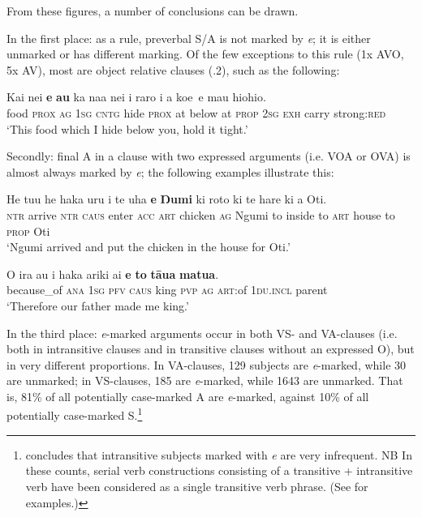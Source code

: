 From these figures, a number of conclusions can be drawn. 

In the first place: as a rule, preverbal S/A is not marked by \textit{e}; it is either unmarked or has different marking. Of the few exceptions to this rule (1x AVO, 5x AV), most are object relative clauses (.2), such as the following:

\ea\label{ex:8.8}
\gll Kai nei {\ob}\textbf{e} \textbf{au} ka na{\ꞌ}a nei {\ꞌ}i raro i a koe\,{\cb} e ma{\ꞌ}u hiohio.\\
food \textsc{prox} {\db}\textsc{ag} \textsc{1sg} \textsc{cntg} hide \textsc{prox} at below at \textsc{prop} \textsc{2sg} \textsc{exh} carry strong:\textsc{red}\\

\glt 
‘This food which I hide below you, hold it tight.’ \textstyleExampleref{[R310.074]} 
\z

Secondly: final A in a clause with two expressed arguments (i.e. VOA or OVA) is almost always marked by \textit{e}; the following examples illustrate this:

\ea\label{ex:8.9}
\gll He tu{\ꞌ}u he haka uru i te {\ꞌ}uha \textbf{e} \textbf{Ŋumi} ki roto ki te hare  ki a Oti.\\
\textsc{ntr} arrive \textsc{ntr} \textsc{caus} enter \textsc{acc} \textsc{art} chicken \textsc{ag} Ngumi to inside to \textsc{art} house  to \textsc{prop} Oti\\

\glt 
‘Ngumi arrived and put the chicken in the house for Oti.’ \textstyleExampleref{[MsE-105b.004]}
\z

\ea\label{ex:8.10}
\gll {\ꞌ}O ira au i haka {\ꞌ}ariki ai \textbf{e} \textbf{to} \textbf{tāua} \textbf{matu{\ꞌ}a}.\\
because\_of \textsc{ana} \textsc{1sg} \textsc{pfv} \textsc{caus} king \textsc{pvp} \textsc{ag} \textsc{art}:of \textsc{1du.incl} parent\\

\glt 
‘Therefore our father made me king.’ \textstyleExampleref{[Ley-2-06.03]}
\z

In the third place: \textit{e}{}-marked arguments occur in both VS- and VA-clauses (i.e. both in intransitive clauses and in transitive clauses without an expressed O), but in very different proportions. In VA-clauses, 129 subjects are \textit{e}{}-marked, while 30 are unmarked; in VS-clauses, 185 are \textit{e}{}-marked, while 1643 are unmarked. That is, 81\% of all potentially case-marked A are \textit{e}{}-marked, against 10\% of all potentially case-marked S.\footnote{\label{fn:390}\citet[39]{WeberN2003} concludes that intransitive subjects marked with \textit{e} are very infrequent. 
NB In these counts, serial verb constructions consisting of a transitive + intransitive verb have been considered as a single transitive verb phrase. (See \citealt[39]{WeberN2003} for examples.)} 


